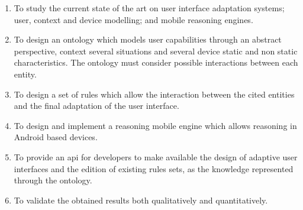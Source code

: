 \begin{enumerate}
  \item To study the current state of the art on user interface adaptation 
  systems; user, context and device modelling; and mobile reasoning engines.

  \item To design an ontology which models user capabilities through an abstract
  perspective, context several situations and several device static and non 
  static characteristics. The ontology must consider possible interactions 
  between each entity.

  \item To design a set of rules which allow the interaction between the cited
  entities and the final adaptation of the user interface.

  \item To design and implement a reasoning mobile engine which allows reasoning
  in Android based devices.

  \item To provide an \ac{api} for developers to make available the design of 
  adaptive user interfaces and the edition of existing rules sets, as the 
  knowledge represented through the ontology.

  \item To validate the obtained results both qualitatively and quantitatively.
  
  
\end{enumerate}


% 
%   
%   



